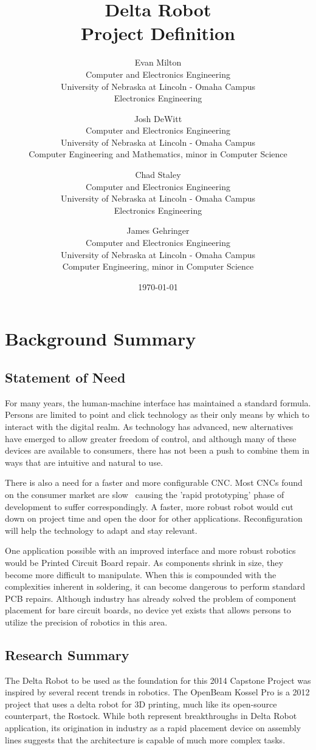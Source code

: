 \documentclass[11pt]{report}
\title{\TitleFont Delta Robot \\ Project Definition}
\author{
	Evan Milton \\
	Computer and Electronics Engineering \\
	University of Nebraska at Lincoln - Omaha Campus \\
	Electronics Engineering
		\and
	Josh DeWitt \\
	Computer and Electronics Engineering \\
	University of Nebraska at Lincoln - Omaha Campus \\
	Computer Engineering and Mathematics, minor in Computer Science
		\and
	Chad Staley \\
	Computer and Electronics Engineering \\
	University of Nebraska at Lincoln - Omaha Campus \\
	Electronics Engineering
		\and
	James Gehringer \\
	Computer and Electronics Engineering \\
	University of Nebraska at Lincoln - Omaha Campus \\
	Computer Engineering, minor in Computer Science
}
\date{\today}
\begin{document}
\maketitle

\tableofcontents

\chapter{Background Summary}
\section{Statement of Need}
For many years, the human-machine interface has maintained a standard formula.
Persons are limited to point and click technology as their only means by which to interact with the digital realm.
As technology has advanced, new alternatives have emerged to allow  greater freedom of control, and although many of these devices are available to consumers, there has not been a push to combine them in ways that are intuitive and natural to use.

There is also a need for a faster and more configurable CNC.
Most CNCs found on the consumer market are slow~ causing the 'rapid prototyping' phase of development to suffer correspondingly.
A faster, more robust robot would cut down on project time and open the door for other applications.
Reconfiguration will help the technology to adapt and stay relevant.

One application possible with an improved interface and more robust robotics would be Printed Circuit Board repair.
As components shrink in size, they become more difficult to manipulate.
When this is compounded with the complexities inherent in soldering, it can become dangerous to perform standard PCB repairs.
Although industry has already solved the problem of component placement for bare circuit boards, no device yet exists that allows persons to utilize the precision of robotics in this area. 

\section{Research Summary}
The Delta Robot to be used as the foundation for this 2014 Capstone Project was inspired by several recent trends in robotics.
The OpenBeam Kossel Pro is a 2012 project that uses a delta robot for 3D printing, much like its open-source counterpart, the Rostock.
While both represent breakthroughs in Delta Robot application, its origination in industry as a rapid placement device on assembly lines suggests that the architecture is capable of much more complex tasks.
\end{document}
